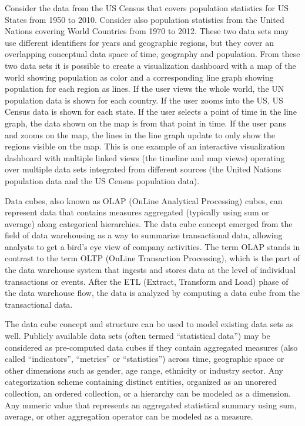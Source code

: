 \documentclass[12pt]{article}
\begin{document}
\begin{doublespace}
Consider the data from the US Census that covers population statistics for US States from 1950 to 2010. Consider also population statistics from the United Nations covering World Countries from 1970 to 2012. These two data sets may use different identifiers for years and geographic regions, but they cover an overlapping conceptual data space of time, geography and population. From these two data sets it is possible to create a visualization dashboard with a map of the world showing population as color and a corresponding line graph showing population for each region as lines. If the user views the whole world, the UN population data is shown for each country. If the user zooms into the US, US Census data is shown for each state. If the user selects a point of time in the line graph, the data shown on the map is from that point in time. If the user pans and zooms on the map, the lines in the line graph update to only show the regions visible on the map. This is one example of an interactive visualization dashboard with multiple linked views (the timeline and map views) operating over multiple data sets integrated from different sources (the United Nations population data and the US Census population data).


Data cubes, also known as OLAP (OnLine Analytical Processing) cubes, can represent data that contains measures aggregated (typically using sum or average) along categorical hierarchies. The data cube concept emerged from the field of data warehousing as a way to summarize transactional data, allowing analysts to get a bird's eye view of company activities. The term OLAP stands in contrast to the term OLTP (OnLine Transaction Processing), which is the part of the data warehouse system that ingests and stores data at the level of individual transactions or events. After the ETL (Extract, Transform and Load) phase of the data warehouse flow, the data is analyzed by computing a data cube from the transactional data.

The data cube concept and structure can be used to model existing data sets as well. Publicly available data sets (often termed ``statistical data'') may be considered as pre-computed data cubes if they contain aggregated measures (also called ``indicators'', ``metrics'' or ``statistics'') across time, geographic space or other dimensions such as gender, age range, ethnicity or industry sector. Any categorization scheme containing distinct entities, organized as an unorered collection, an ordered collection, or a hierarchy can be modeled as a dimension. Any numeric value that represents an aggregated statistical summary using sum, average, or other aggregation operator can be modeled as a measure.


\end{doublespace}
\end{document}
